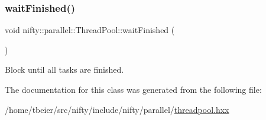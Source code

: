 \subsubsection{\texorpdfstring{wait\+Finished()}{waitFinished()}}
{\footnotesize\ttfamily void nifty\+::parallel\+::\+Thread\+Pool\+::wait\+Finished (\begin{DoxyParamCaption}{ }\end{DoxyParamCaption})\hspace{0.3cm}{\ttfamily [inline]}}

Block until all tasks are finished. 

The documentation for this class was generated from the following file\+:\begin{DoxyCompactItemize}
\item 
/home/tbeier/src/nifty/include/nifty/parallel/\hyperlink{threadpool_8hxx}{threadpool.\+hxx}\end{DoxyCompactItemize}
